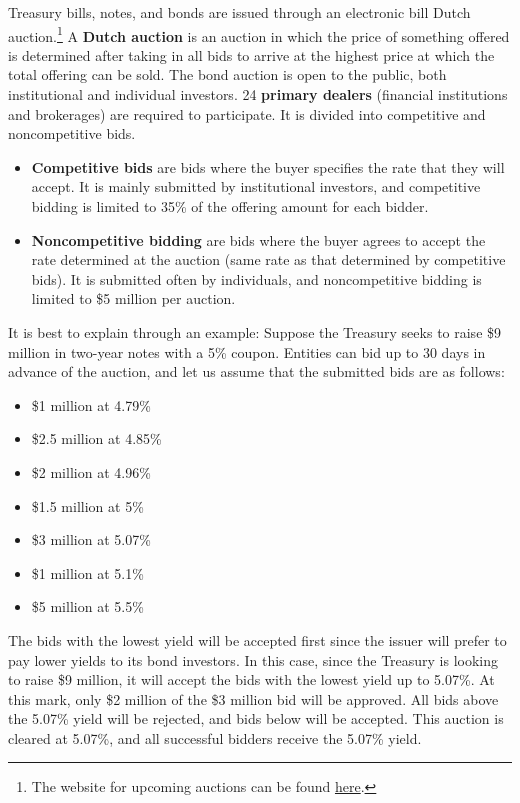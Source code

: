 \documentclass{article}
\begin{document}
    Treasury bills, notes, and bonds are issued through an electronic bill Dutch auction.\footnote{The website for upcoming auctions can be found \href{https://www.treasurydirect.gov/auctions/upcoming/}{here}.} A \textbf{Dutch auction} is an auction in which the price of something offered is determined after taking in all bids to arrive at the highest price at which the total offering can be sold. The bond auction is open to the public, both institutional and individual investors. 24 \textbf{primary dealers} (financial institutions and brokerages) are required to participate. It is divided into competitive and noncompetitive bids.
    \begin{itemize}
        \item \textbf{Competitive bids} are bids where the buyer specifies the rate that they will accept. It is mainly submitted by institutional investors, and competitive bidding is limited to 35\% of the offering amount for each bidder.
        \item \textbf{Noncompetitive bidding} are bids where the buyer agrees to accept the rate determined at the auction (same rate as that determined by competitive bids). It is submitted often by individuals, and noncompetitive bidding is limited to \$5 million per auction.
    \end{itemize}

    \begin{example}
      \label{ex:dutch-auction-for-treasury-bonds}
      It is best to explain through an example: Suppose the Treasury seeks to raise \$9 million in two-year notes with a 5\% coupon. Entities can bid up to 30 days in advance of the auction, and let us assume that the submitted bids are as follows:
      \begin{itemize}
          \item \$1 million at 4.79\%
          \item \$2.5 million at 4.85\%
          \item \$2 million at 4.96\%
          \item \$1.5 million at 5\%
          \item \$3 million at 5.07\%
          \item \$1 million at 5.1\%
          \item \$5 million at 5.5\%
      \end{itemize}
      The bids with the lowest yield will be accepted first since the issuer will prefer to pay lower yields to its bond investors. In this case, since the Treasury is looking to raise \$9 million, it will accept the bids with the lowest yield up to 5.07\%. At this mark, only \$2 million of the \$3 million bid will be approved. All bids above the 5.07\% yield will be rejected, and bids below will be accepted. This auction is cleared at 5.07\%, and all successful bidders receive the 5.07\% yield.
    \end{example}
\end{document}
